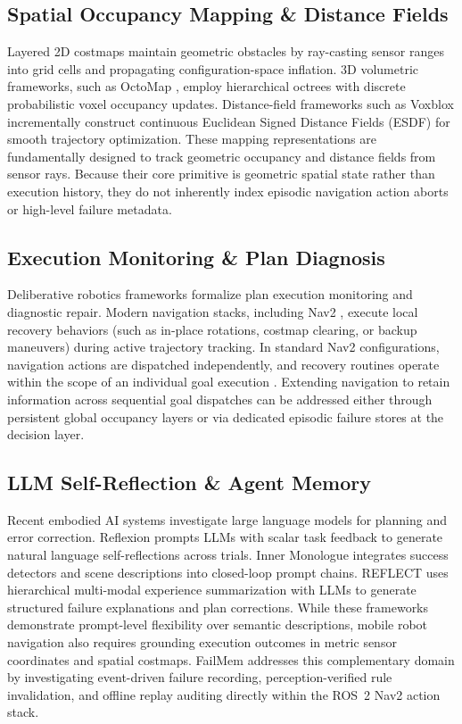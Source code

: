 \subsection{Spatial Occupancy Mapping \& Distance Fields}
Layered 2D costmaps \cite{lu2014layered, macenski2020marathon2} maintain geometric obstacles by ray-casting sensor ranges into grid cells and propagating configuration-space inflation. 3D volumetric frameworks, such as OctoMap \cite{hornung2013octomap}, employ hierarchical octrees with discrete probabilistic voxel occupancy updates. Distance-field frameworks such as Voxblox \cite{oleynikova2017voxblox} incrementally construct continuous Euclidean Signed Distance Fields (ESDF) for smooth trajectory optimization. These mapping representations are fundamentally designed to track geometric occupancy and distance fields from sensor rays. Because their core primitive is geometric spatial state rather than execution history, they do not inherently index episodic navigation action aborts or high-level failure metadata.

\subsection{Execution Monitoring \& Plan Diagnosis}
Deliberative robotics frameworks \cite{fikes1971strips, simmons1998xavier, ingrand2017deliberation} formalize plan execution monitoring and diagnostic repair. Modern navigation stacks, including Nav2 \cite{macenski2020marathon2}, execute local recovery behaviors (such as in-place rotations, costmap clearing, or backup maneuvers) during active trajectory tracking. In standard Nav2 configurations, navigation actions are dispatched independently, and recovery routines operate within the scope of an individual goal execution \cite{macenski2020marathon2}. Extending navigation to retain information across sequential goal dispatches can be addressed either through persistent global occupancy layers or via dedicated episodic failure stores at the decision layer.

\subsection{LLM Self-Reflection \& Agent Memory}
Recent embodied AI systems investigate large language models for planning and error correction. Reflexion \cite{shinn2023reflexion} prompts LLMs with scalar task feedback to generate natural language self-reflections across trials. Inner Monologue \cite{huang2023inner} integrates success detectors and scene descriptions into closed-loop prompt chains. REFLECT \cite{liu2023reflect} uses hierarchical multi-modal experience summarization with LLMs to generate structured failure explanations and plan corrections. While these frameworks demonstrate prompt-level flexibility over semantic descriptions, mobile robot navigation also requires grounding execution outcomes in metric sensor coordinates and spatial costmaps. FailMem addresses this complementary domain by investigating event-driven failure recording, perception-verified rule invalidation, and offline replay auditing directly within the ROS~2 Nav2 action stack.


